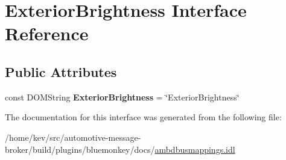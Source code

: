 \hypertarget{interfaceExteriorBrightness}{\section{Exterior\+Brightness Interface Reference}
\label{interfaceExteriorBrightness}
}
\subsection*{Public Attributes}
\begin{DoxyCompactItemize}
\item 
\hypertarget{interfaceExteriorBrightness_aee82775a15fc8ef0ddc7de078871921f}{const D\+O\+M\+String {\bfseries Exterior\+Brightness} = \char`\"{}Exterior\+Brightness\char`\"{}}\label{interfaceExteriorBrightness_aee82775a15fc8ef0ddc7de078871921f}

\end{DoxyCompactItemize}


The documentation for this interface was generated from the following file\+:\begin{DoxyCompactItemize}
\item 
/home/kev/src/automotive-\/message-\/broker/build/plugins/bluemonkey/docs/\hyperlink{ambdbusmappings_8idl}{ambdbusmappings.\+idl}\end{DoxyCompactItemize}
